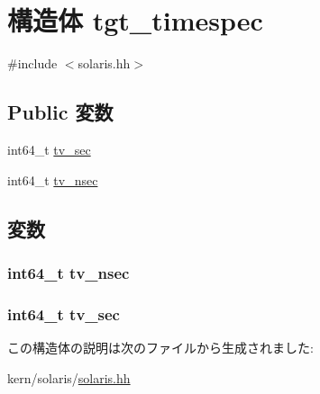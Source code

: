 \hypertarget{structSolaris_1_1tgt__timespec}{
\section{構造体 tgt\_\-timespec}
\label{structSolaris_1_1tgt__timespec}
}


{\ttfamily \#include $<$solaris.hh$>$}\subsection*{Public 変数}
\begin{DoxyCompactItemize}
\item 
int64\_\-t \hyperlink{structSolaris_1_1tgt__timespec_ade91ea7e70df7db611d15bdda30a6dd9}{tv\_\-sec}
\item 
int64\_\-t \hyperlink{structSolaris_1_1tgt__timespec_adb0c9867ba75f20c6b860e997883ba1d}{tv\_\-nsec}
\end{DoxyCompactItemize}


\subsection{変数}
\hypertarget{structSolaris_1_1tgt__timespec_adb0c9867ba75f20c6b860e997883ba1d}{
\subsubsection[{tv\_\-nsec}]{\setlength{\rightskip}{0pt plus 5cm}int64\_\-t {\bf tv\_\-nsec}}}
\label{structSolaris_1_1tgt__timespec_adb0c9867ba75f20c6b860e997883ba1d}
\hypertarget{structSolaris_1_1tgt__timespec_ade91ea7e70df7db611d15bdda30a6dd9}{
\subsubsection[{tv\_\-sec}]{\setlength{\rightskip}{0pt plus 5cm}int64\_\-t {\bf tv\_\-sec}}}
\label{structSolaris_1_1tgt__timespec_ade91ea7e70df7db611d15bdda30a6dd9}


この構造体の説明は次のファイルから生成されました:\begin{DoxyCompactItemize}
\item 
kern/solaris/\hyperlink{kern_2solaris_2solaris_8hh}{solaris.hh}\end{DoxyCompactItemize}
